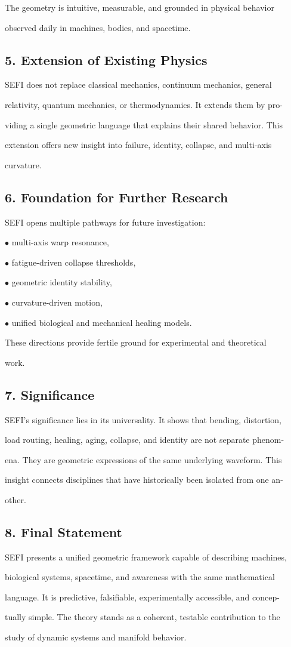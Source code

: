 \documentclass[10pt]{article}
\begin{document}
The geometry is intuitive, measurable, and grounded in physical behavior

observed daily in machines, bodies, and spacetime.

\subsection*{5. Extension of Existing Physics}
SEFI does not replace classical mechanics, continuum mechanics, general

relativity, quantum mechanics, or thermodynamics. It extends them by pro-

viding a single geometric language that explains their shared behavior. This

extension offers new insight into failure, identity, collapse, and multi-axis

curvature.

\subsection*{6. Foundation for Further Research}
SEFI opens multiple pathways for future investigation:

\noindent $\bullet$ multi-axis warp resonance,

\noindent $\bullet$ fatigue-driven collapse thresholds,

\noindent $\bullet$ geometric identity stability,

\noindent $\bullet$ curvature-driven motion,

\noindent $\bullet$ unified biological and mechanical healing models.

These directions provide fertile ground for experimental and theoretical

work.


\subsection*{7. Significance}
SEFI's significance lies in its universality. It shows that bending, distortion,

load routing, healing, aging, collapse, and identity are not separate phenom-

ena. They are geometric expressions of the same underlying waveform. This

insight connects disciplines that have historically been isolated from one an-

other.

\subsection*{8. Final Statement}
SEFI presents a unified geometric framework capable of describing machines,

biological systems, spacetime, and awareness with the same mathematical

language. It is predictive, falsifiable, experimentally accessible, and concep-

tually simple. The theory stands as a coherent, testable contribution to the

study of dynamic systems and manifold behavior.
\end{document}
